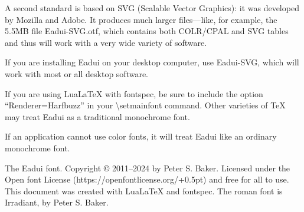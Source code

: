 \documentclass[11pt,letterpaper,twoside,openany]{book}
\begin{document}
A second standard is based on SVG (Scalable Vector Graphics): it was developed by
Mozilla and Adobe. It produces much larger files---like, for example, the 5.5MB file
Eadui-SVG.otf, which contains both COLR/CPAL and SVG tables and thus will work with
a very wide variety of software.

If you are installing Eadui on your desktop computer, use Eadui-SVG, which will work with
most or all desktop software.

If you are using {Lua\LaTeX} with fontspec, be sure to include the option “Renderer=Harfbuzz” in your
\textbackslash setmainfont command. Other varieties of {\TeX} may treat Eadui as a traditional
monochrome font.

If an application cannot use color fonts, it will treat Eadui like an ordinary monochrome font.
\vfill

\noindent\irit The Eadui font. Copyright © 2011--2024 by Peter S. Baker. Licensed under the Open font
License (https://openfontlicense.org/\kern+0.5pt) and free for all to use. This document was
created with {Lua\LaTeX} and fontspec. The roman font is Irradiant, by Peter S. Baker.
\end{document}
